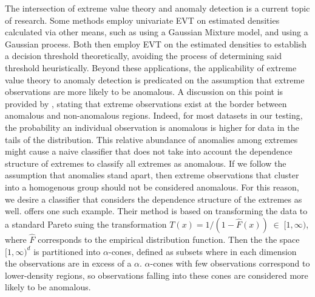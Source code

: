 The intersection of extreme value theory and anomaly detection is a current 
    topic of research.  Some methods employ univariate EVT on estimated 
    densities calculated via other means, such as \cite{clifton2011} using a 
    Gaussian Mixture model, and \cite{gu2021} using a Gaussian process.  Both 
    then employ EVT on the estimated densities to establish a decision 
    threshold theoretically, avoiding the process of determining said
    threshold heuristically.  Beyond these applications,
    the applicability of extreme value theory to anomaly detection is predicated on 
    the assumption that extreme observations are more likely to be anomalous.  
    A discussion on this point is provided by \cite{goix2017}, stating that 
    extreme observations exist at the border between anomalous and non-anomalous 
    regions.  Indeed, for most datasets in our testing, the probability an 
    individual observation is anomalous is higher for data in the tails of the 
    distribution. This relative abundance of anomalies among extremes might 
    cause a naive classifier that does not take into account the dependence 
    structure of extremes to classify all extremes as anomalous.  If we follow 
    the assumption that anomalies stand apart, then extreme observations that 
    cluster into a homogenous group should not be considered anomalous.  For 
    this reason, we desire a classifier that considers the dependence structure 
    of the extremes as well. \cite{goix2017} offers one such example.
    Their method is based on transforming the data to a standard 
    Pareto suing the transformation  $T(x) = 1/(1 - \hat{F}(x))\;\in\;[1,\infty)$, 
    where $\hat{F}$ corresponds  to the empirical distribution function. Then the 
    the space $[1,\infty)^d$ is partitioned into $\alpha$-cones, defined as 
    subsets where in each dimension the observations are in excess of a $\alpha$.
    $\alpha$-cones with few observations correspond to lower-density regions, so 
    observations falling into these cones are considered more likely to be anomalous.

